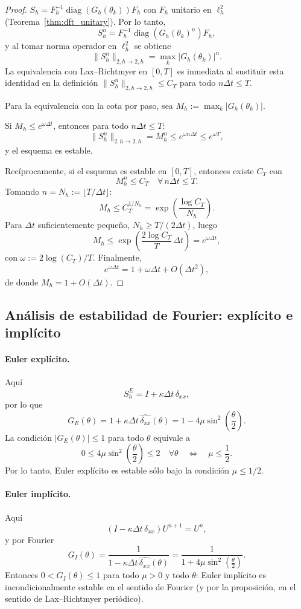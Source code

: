 \documentclass[a4paper,11pt]{report}
\begin{document}
\begin{proof}
$S_h=F_h^{-1}\operatorname{diag}(G_h(\theta_k))F_h$ con $F_h$ unitario en $\ell^2_h$ (Teorema~\ref{thm:dft_unitary}). Por lo tanto,
\[
S_h^n=F_h^{-1}\operatorname{diag}(G_h(\theta_k)^n)F_h,
\]
y al tomar norma operador en $\ell_h^2$ se obtiene
\[
\|S_h^n\|_{2,h\to2,h}=\max_k|G_h(\theta_k)|^n.
\]
La equivalencia con Lax--Richtmyer en $[0,T]$ es inmediata al sustituir esta identidad en la definición
\(
\|S_h^n\|_{2,h\to2,h}\le C_T
\) para todo $n\Delta t\le T$.

Para la equivalencia con la cota por paso, sea $M_h:=\max_k|G_h(\theta_k)|$.

Si $M_h\le e^{\omega\Delta t}$, entonces para todo $n\Delta t\le T$:
\[
\|S_h^n\|_{2,h\to2,h}=M_h^n\le e^{\omega n\Delta t}\le e^{\omega T},
\]
y el esquema es estable.

Recíprocamente, si el esquema es estable en $[0,T]$, entonces existe $C_T$ con
\[
M_h^n\le C_T\quad\forall\,n\Delta t\le T.
\]
Tomando $n=N_h:=\lfloor T/\Delta t\rfloor$:
\[
M_h\le C_T^{1/N_h}=\exp\!\left(\frac{\log C_T}{N_h}\right).
\]
Para $\Delta t$ suficientemente pequeño, $N_h\ge T/(2\Delta t)$, luego
\[
M_h\le \exp\!\left(\frac{2\log C_T}{T}\,\Delta t\right)=e^{\omega\Delta t},
\]
con $\omega:=2\log(C_T)/T$. Finalmente,
\[
e^{\omega\Delta t}=1+\omega\Delta t+O(\Delta t^2),
\]
de donde $M_h=1+O(\Delta t)$.
\end{proof}

\subsection{Análisis de estabilidad de Fourier: explícito e implícito}

\paragraph{Euler explícito.}
Aquí
\[
  S_h^{E}=I+\kappa\Delta t\,\delta_{xx},
\]
por lo que
\[
  G_E(\theta)=1+\kappa\Delta t\,\widehat{\delta_{xx}}(\theta)
  =1-4\mu\sin^2\!\left(\frac{\theta}{2}\right).
\]
La condición $|G_E(\theta)|\le1$ para todo $\theta$ equivale a
\[
  0\le 4\mu\sin^2\!\left(\frac{\theta}{2}\right)\le 2\quad\forall\theta
  \quad\Longleftrightarrow\quad
  \mu\le\frac{1}{2}.
\]
Por lo tanto, Euler explícito es estable sólo bajo la condición $\mu\le1/2$.

\paragraph{Euler implícito.}
Aquí
\[
  (I-\kappa\Delta t\,\delta_{xx})U^{n+1}=U^n,
\]
y por Fourier
\[
  G_I(\theta)=\frac{1}{1-\kappa\Delta t\,\widehat{\delta_{xx}}(\theta)}
  =\frac{1}{1+4\mu\sin^2\!\left(\frac{\theta}{2}\right)}.
\]
Entonces $0<G_I(\theta)\le1$ para todo $\mu>0$ y todo $\theta$: Euler implícito es incondicionalmente estable en el sentido de Fourier (y por la proposición, en el sentido de Lax--Richtmyer periódico).
\end{document}
